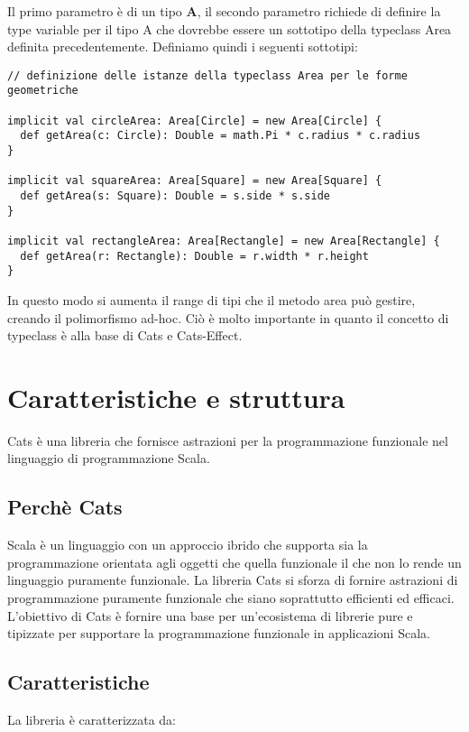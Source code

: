 \noindent Il primo parametro è di un tipo \textbf{A}, il secondo parametro richiede di definire la type variable per il tipo A che dovrebbe essere un sottotipo della typeclass Area definita precedentemente. Definiamo quindi i seguenti sottotipi:

\begin{verbatim}
// definizione delle istanze della typeclass Area per le forme geometriche

implicit val circleArea: Area[Circle] = new Area[Circle] {
  def getArea(c: Circle): Double = math.Pi * c.radius * c.radius
}

implicit val squareArea: Area[Square] = new Area[Square] {
  def getArea(s: Square): Double = s.side * s.side
}

implicit val rectangleArea: Area[Rectangle] = new Area[Rectangle] {
  def getArea(r: Rectangle): Double = r.width * r.height
}
\end{verbatim}

\noindent In questo modo si aumenta il range di tipi che il metodo area può gestire, creando il polimorfismo ad-hoc. Ciò è molto importante in quanto il concetto di typeclass è alla base di Cats e Cats-Effect.

\section{Caratteristiche e struttura}
Cats è una libreria che fornisce astrazioni per la programmazione funzionale nel linguaggio di programmazione Scala. 

\subsection{Perchè Cats}
Scala è un linguaggio con un approccio ibrido che supporta sia la programmazione orientata agli oggetti che quella funzionale il che non lo rende un linguaggio puramente funzionale. La libreria Cats si sforza di fornire astrazioni di programmazione puramente funzionale che siano soprattutto efficienti ed efficaci. L’obiettivo di Cats è fornire una base per un’ecosistema di librerie pure e tipizzate per supportare la programmazione funzionale in applicazioni Scala.

\subsection{Caratteristiche}
La libreria è caratterizzata da:

